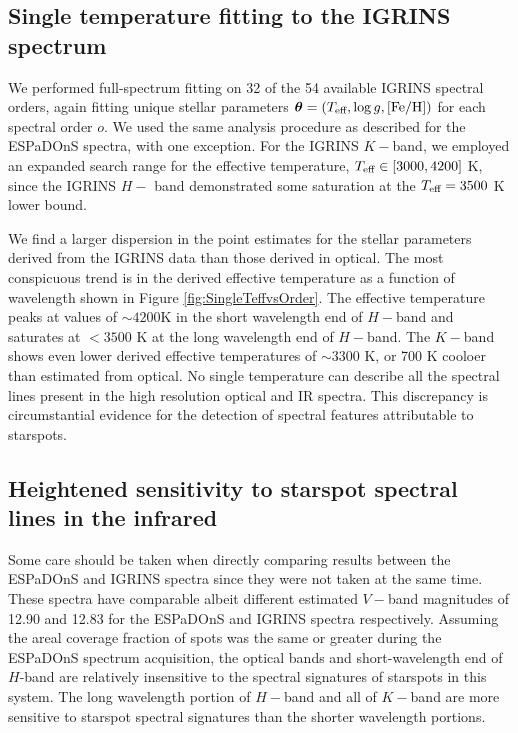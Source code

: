 \documentclass[twocolumn]{emulateapj}%
\begin{document}
\subsection{Single temperature fitting to the IGRINS spectrum}\label{sec:IGR_starfish}

We performed full-spectrum fitting on 32 of the 54 available IGRINS spectral orders, again fitting unique stellar parameters ${\bm \theta} = (T_\textrm{eff}, \log g, [{\rm Fe}/{\rm H}])$ for each spectral order $o$.  We used the same analysis procedure as described for the ESPaDOnS spectra, with one exception.  For the IGRINS $K-$band, we employed an expanded search range for the effective temperature, $T_\textrm{eff} \in [3000, 4200]$ K, since the IGRINS $H-$ band demonstrated some saturation at the $T_\textrm{eff}=3500$ K lower bound.  

We find a larger dispersion in the point estimates for the stellar parameters derived from the IGRINS data than those derived in optical.  The most conspicuous trend is in the derived effective temperature as a function of wavelength shown in Figure \ref{fig:SingleTeffvsOrder}.  The effective temperature peaks at values of $\sim4200$K in the short wavelength end of $H-$band and saturates at $<3500$ K at the long wavelength end of $H-$band.  The $K-$band shows even lower derived effective temperatures of $\sim3300$ K, or 700 K cooloer than estimated from optical.  No single temperature can describe all the spectral lines present in the high resolution optical and IR spectra.  This discrepancy is circumstantial evidence for the detection of spectral features attributable to starspots.  


\subsection{Heightened sensitivity to starspot spectral lines in the infrared}\label{sec:whyNearIR}

Some care should be taken when directly comparing results between the ESPaDOnS and IGRINS spectra since they were not taken at the same time.  These spectra have comparable albeit different estimated $V-$band magnitudes of 12.90 and 12.83 for the ESPaDOnS and IGRINS spectra respectively.  Assuming the areal coverage fraction of spots was the same or greater during the ESPaDOnS spectrum acquisition, the optical bands and short-wavelength end of $H$-band are relatively insensitive to the spectral signatures of starspots in this system.  The long wavelength portion of $H-$band and all of $K-$band are more sensitive to starspot spectral signatures than the shorter wavelength portions.
\end{document}

